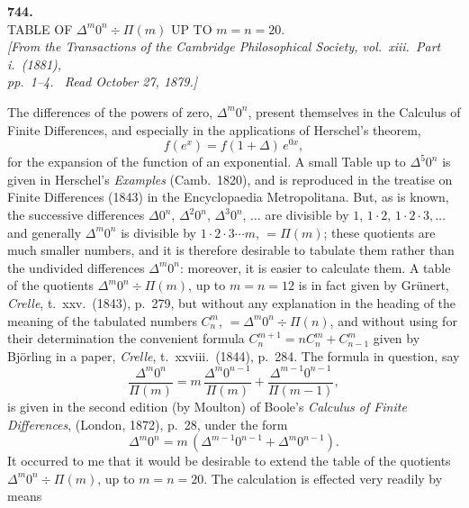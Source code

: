 \documentclass[11pt]{article}
\begin{document}
\bigskip

\begin{center}
\textbf{744.}\\[6pt]
\textsc{TABLE OF $\Delta^m 0^n \div \Pi(m)$ UP TO $m = n = 20$.}\\[6pt]
\textit{[From the Transactions of the Cambridge Philosophical Society, vol.\ xiii.\ Part i.\ (1881),\\
pp.\ 1--4. \ Read October 27, 1879.]}
\end{center}

\bigskip

The differences of the powers of zero, $\Delta^m 0^n$, present themselves in the Calculus
of Finite Differences, and especially in the applications of Herschel's theorem,
\[
   f(e^x) = f(1 + \Delta)\,e^{0x},
\]
for the expansion of the function of an exponential. A small Table up to $\Delta^5 0^n$ is
given in Herschel's \textit{Examples} (Camb.\ 1820), and is reproduced in the treatise on
Finite Differences (1843) in the Encyclopaedia Metropolitana. But, as is known, the
successive differences $\Delta 0^n$, $\Delta^2 0^n$, $\Delta^3 0^n$, $\ldots$ are divisible by $1$, $1 \cdot 2$, $1 \cdot 2 \cdot 3,\ldots$ and
generally $\Delta^m 0^n$ is divisible by $1 \cdot 2 \cdot 3 \cdots m$, $= \Pi(m)$; these quotients are much smaller
numbers, and it is therefore desirable to tabulate them rather than the undivided
differences $\Delta^m 0^n$: moreover, it is easier to calculate them. A table of the quotients
$\Delta^m 0^n \div \Pi(m)$, up to $m = n = 12$ is in fact given by Gr\"unert, \textit{Crelle}, t.\ xxv.\ (1843),
p.\ 279, but without any explanation in the heading of the meaning of the tabulated
numbers $C_n^m$, $= \Delta^m 0^n \div \Pi(n)$, and without using for their determination the convenient
formula $C_n^{m+1} = nC_n^m + C_{n-1}^m$ given by Bj\"orling in a paper, \textit{Crelle}, t.\ xxviii.\ (1844),
p.\ 284. The formula in question, say
\[
   \frac{\Delta^m 0^n}{\Pi(m)} = m\,\frac{\Delta^m 0^{n-1}}{\Pi(m)} + \frac{\Delta^{m-1} 0^{n-1}}{\Pi(m-1)},
\]
is given in the second edition (by Moulton) of Boole's \textit{Calculus of Finite Differences},
(London, 1872), p.\ 28, under the form
\[
   \Delta^m 0^n = m\,(\Delta^{m-1} 0^{n-1} + \Delta^m 0^{n-1}).
\]
It occurred to me that it would be desirable to extend the table of the quotients
$\Delta^m 0^n \div \Pi(m)$, up to $m = n = 20$. The calculation is effected very readily by means
\end{document}
